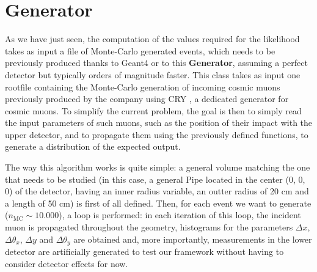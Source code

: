 \documentclass[a4paper, 11pt, twoside, openright]{report}
\begin{document}
\begin{itemize}

    

\end{itemize}

\section{Generator} \label{sec:Generator}

As we have just seen, the computation of the values required for the likelihood takes as input a file of Monte-Carlo generated events, which needs to be previously produced thanks to Geant4 or to this \textbf{Generator}, assuming a perfect detector but typically orders of magnitude faster. This class takes as input one rootfile containing the Monte-Carlo generation of incoming cosmic muons previously produced by the company using CRY \cite{CRY}, a dedicated generator for cosmic muons. To simplify the current problem, the goal is then to simply read the input parameters of such muons, such as the position of their impact with the upper detector, and to propagate them using the previously defined functions, to generate a distribution of the expected output.

The way this algorithm works is quite simple: a general volume matching the one that needs to be studied (in this case, a general Pipe located in the center (0, 0, 0) of the detector, having an inner radius variable, an outter radius of 20 cm and a length of 50 cm) is first of all defined. Then, for each event we want to generate ($n_{\text{MC}} \sim 10.000$), a loop is performed: in each iteration of this loop, the incident muon is propagated throughout the geometry, histograms for the parameters $\Delta x$, $\Delta \theta_x$, $\Delta y$ and $\Delta \theta_y$ are obtained and, more importantly, measurements in the lower detector are artificially generated to test our framework without having to consider detector effects for now.
\end{document}
